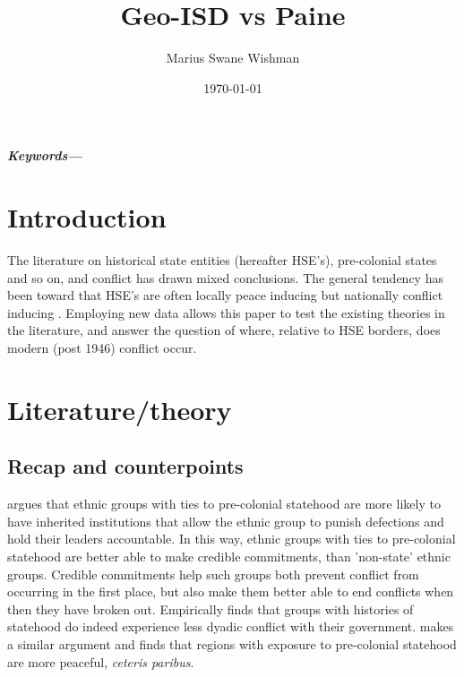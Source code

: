 \documentclass[12pt]{article}
\title{Geo-ISD vs Paine}
\author[1]{Marius Swane Wishman}
\affil[1]{Department of Sociology and Political Science, NTNU}
\date{\today}
\providecommand{\keywords}[1]
{
	\small	
	\textbf{\textit{Keywords---}} #1
}
\begin{document}
\maketitle

\begin{abstract}
\end{abstract}

\keywords{}

\pagebreak


\onehalfspacing

\section{Introduction}

The literature on historical state entities (hereafter HSE's), pre-colonial
states and so on, and conflict has drawn mixed conclusions.  The general
tendency has been toward that HSE's are often locally peace inducing
\citep{Wig2016, Wig2018} but nationally conflict inducing \citep{Paine2019}.
Employing new data allows this paper to test the existing theories in the
literature, and answer the question of where, relative to HSE borders, does
modern (post 1946) conflict occur.

\section{Literature/theory}

\subsection{Recap \citet{Wig2016} and counterpoints}

\citet{Wig2016} argues that ethnic groups with ties to pre-colonial statehood
are more likely to have inherited institutions that allow the ethnic group to
punish defections and hold their leaders accountable.  In this way, ethnic
groups with ties to pre-colonial statehood are better able to make credible
commitments, than 'non-state' ethnic groups.  Credible commitments help such
groups both prevent conflict from occurring in the first place, but also make
them better able to end conflicts when then they have broken out.  Empirically
\citet{Wig2016} finds that groups with histories of statehood do indeed
experience less dyadic conflict with their government.
\citet{Depetris-Chauvin2016} makes a similar argument and finds that regions
with exposure to pre-colonial statehood are more peaceful, \emph{ceteris
paribus}.
\end{document}
